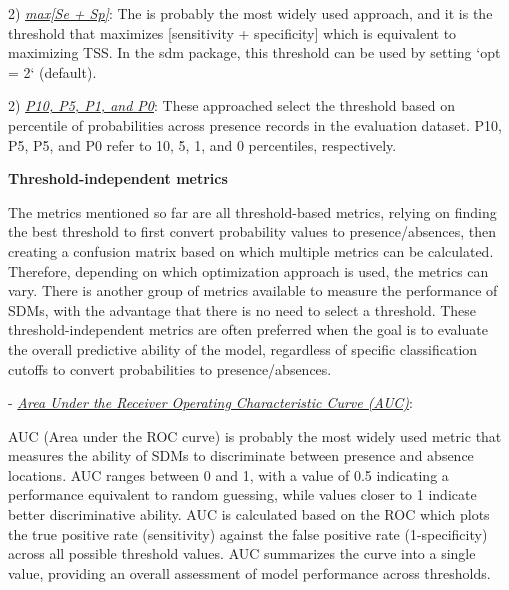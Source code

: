 \documentclass[
]{article}
\begin{document}
\begin{mdframed}[backgroundcolor=gray!10, linecolor=black!75, linewidth=2pt, roundcorner=5pt, shadow=true,frametitle={\textbf{BOX 2: \uline{Model evaluations for SDMs}}}]
2) \uline{\textit{max[Se + Sp]}}: The is probably the most widely used approach, and it is the threshold that maximizes [sensitivity + specificity] which is equivalent to maximizing TSS. In the sdm package, this threshold can be used by setting `opt = 2` (default).

2) \uline{\textit{P10, P5, P1, and P0}}: These approached select the threshold based on percentile of probabilities across presence records in the evaluation dataset. P10, P5, P5, and P0 refer to 10, 5, 1, and 0 percentiles, respectively.


\textbf{\large Threshold-independent metrics}

The metrics mentioned so far are all threshold-based metrics, relying on finding the best threshold to first convert probability values to presence/absences, then creating a confusion matrix based on which multiple metrics can be calculated. Therefore, depending on which optimization approach is used, the metrics can vary. There is another group of metrics available to measure the performance of SDMs, with the advantage that there is no need to select a threshold. These threshold-independent metrics are often preferred when the goal is to evaluate the overall predictive ability of the model, regardless of specific classification cutoffs to convert probabilities to presence/absences.

- \uline{\textit{Area Under the Receiver Operating Characteristic Curve (AUC)}}: 

AUC (Area under the ROC curve) is probably the most widely used metric that measures the ability of SDMs to discriminate between presence and absence locations. AUC ranges between 0 and 1, with a value of 0.5 indicating a performance equivalent to random guessing, while values closer to 1 indicate better discriminative ability. AUC is calculated based on the ROC which plots the true positive rate (sensitivity) against the false positive rate (1-specificity) across all possible threshold values. AUC summarizes the curve into a single value, providing an overall assessment of model performance across thresholds.



\end{mdframed}
\end{document}
